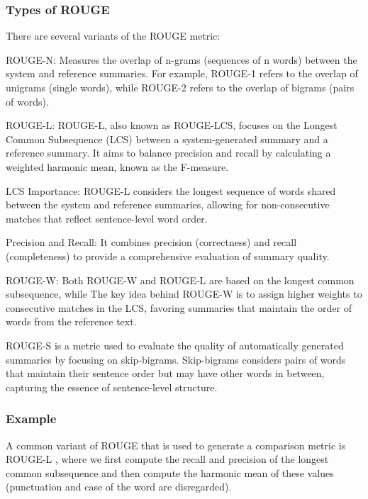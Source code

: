 \subsubsection{Types of ROUGE}
There are several variants of the ROUGE metric:
\begin{bulletedlist}
	\item ROUGE-N: Measures the overlap of n-grams (sequences of n words) between the system and reference summaries. For example, ROUGE-1 refers to the overlap of unigrams (single words), while ROUGE-2 refers to the overlap of bigrams (pairs of words).
	\item ROUGE-L: ROUGE-L, also known as ROUGE-LCS, focuses on the Longest Common Subsequence (LCS) between a system-generated summary and a reference summary. It aims to balance precision and recall by calculating a weighted harmonic mean, known as the F-measure.
	\begin{bulletedlist}
		\item LCS Importance: ROUGE-L considers the longest sequence of words shared between the system and reference summaries, allowing for non-consecutive matches that reflect sentence-level word order.
		\item Precision and Recall: It combines precision (correctness) and recall (completeness) to provide a comprehensive evaluation of summary quality.
	\end{bulletedlist}
	\item ROUGE-W: Both ROUGE-W and ROUGE-L are based on the longest common subsequence, while The key idea behind ROUGE-W is to assign higher weights to consecutive matches in the LCS, favoring summaries that maintain the order of words from the reference text.
	\item ROUGE-S is a metric used to evaluate the quality of automatically generated summaries by focusing on skip-bigrams. Skip-bigrams considers pairs of words that maintain their sentence order but may have other words in between, capturing the essence of sentence-level structure.
\end{bulletedlist}

\subsubsection{Example}
A common variant of ROUGE that is used to generate a comparison metric is ROUGE-L , where we first compute the recall and precision of the longest common subsequence and then compute the harmonic mean of these values (punctuation and case of the word are disregarded). 

